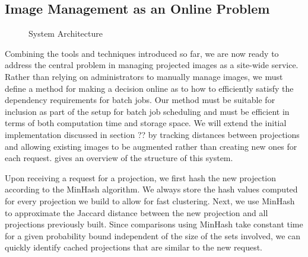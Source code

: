 \documentclass[sigconf]{acmart}
\begin{document}
\subsection{Image Management as an Online Problem}

\begin{figure}[t]
\centering
{}
\caption{System Architecture}
\label{figure:sys-arch}
\end{figure}

Combining the tools and techniques introduced so far,
we are now ready to address the central problem in managing projected images as a site-wide service.
Rather than relying on administrators to manually manage images,
we must define a method for making a decision online as to how to efficiently satisfy the dependency requirements for batch jobs.
Our method must be suitable for inclusion as part of the setup for batch job scheduling and must be efficient in terms of both computation time and storage space.
We will extend the initial implementation discussed in section ?? by tracking distances between projections and allowing existing images to be augmented rather than creating new ones for each request.
 gives an overview of the structure of this system.

Upon receiving a request for a projection,
we first hash the new projection according to the MinHash algorithm.
We always store the hash values computed for every projection we build to allow for fast clustering.
Next, we use MinHash to approximate the Jaccard distance between the new projection and all projections previously built.
Since comparisons using MinHash take constant time for a given probability bound independent of the size of the sets involved,
we can quickly identify cached projections that are similar to the new request.
\end{document}
